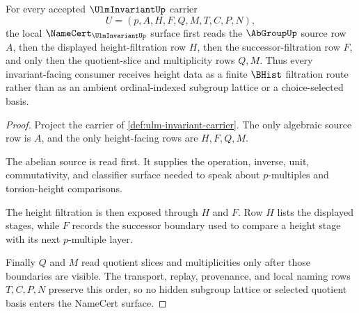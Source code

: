 \begin{theorem}
\label{thm:ulm-invariant-height-filtration-obligation}
For every accepted $\UlmInvariantUp$ carrier
$$
U=(p,A,H,F,Q,M,T,C,P,N),
$$
the local $\NameCert_{\UlmInvariantUp}$ surface first reads the $\AbGroupUp$ source row $A$, then the displayed height-filtration row $H$, then the successor-filtration row $F$, and only then the quotient-slice and multiplicity rows $Q,M$. Thus every invariant-facing consumer receives height data as a finite $\BHist$ filtration route rather than as an ambient ordinal-indexed subgroup lattice or a choice-selected basis.
\end{theorem}
\begin{proof}
Project the carrier of \autoref{def:ulm-invariant-carrier}. The only algebraic source row is $A$, and the only height-facing rows are $H,F,Q,M$.

The abelian source is read first. It supplies the operation, inverse, unit, commutativity, and classifier surface needed to speak about $p$-multiples and torsion-height comparisons.

The height filtration is then exposed through $H$ and $F$. Row $H$ lists the displayed stages, while $F$ records the successor boundary used to compare a height stage with its next $p$-multiple layer.

Finally $Q$ and $M$ read quotient slices and multiplicities only after those boundaries are visible. The transport, replay, provenance, and local naming rows $T,C,P,N$ preserve this order, so no hidden subgroup lattice or selected quotient basis enters the NameCert surface.
\end{proof}

